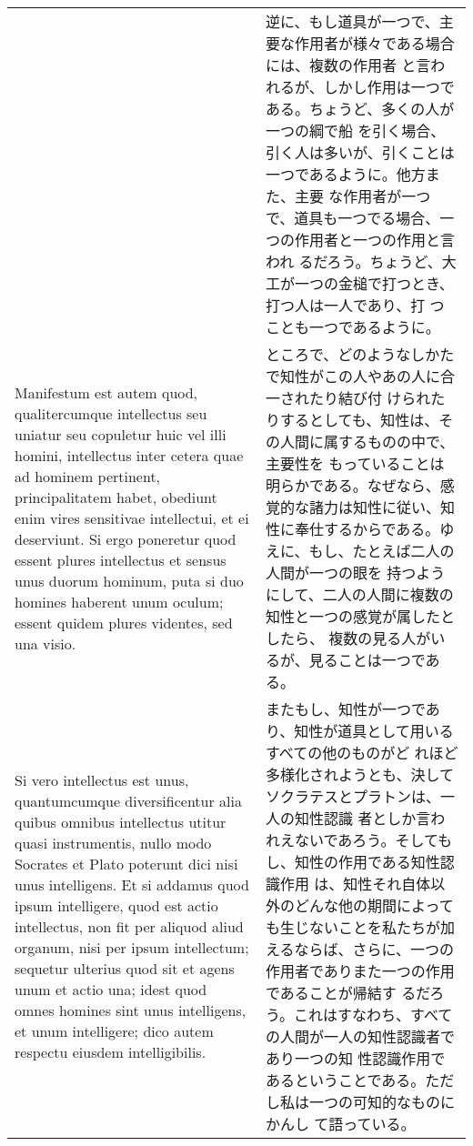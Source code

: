 \documentclass[paper=a4paper,fontsize=10pt,jafontsize=9pt,titlepage]{jlreq}
\begin{document}
\begin{longtable}{p{21em}p{21em}}
&

逆に、もし道具が一つで、主要な作用者が様々である場合には、複数の作用者
と言われるが、しかし作用は一つである。ちょうど、多くの人が一つの綱で船
を引く場合、引く人は多いが、引くことは一つであるように。他方また、主要
な作用者が一つで、道具も一つでる場合、一つの作用者と一つの作用と言われ
るだろう。ちょうど、大工が一つの金槌で打つとき、打つ人は一人であり、打
つことも一つであるように。
 
\\

 Manifestum est autem quod, qualitercumque intellectus seu uniatur seu
 copuletur huic vel illi homini, intellectus inter cetera quae ad
 hominem pertinent, principalitatem habet, obediunt enim vires
 sensitivae intellectui, et ei deserviunt. Si ergo poneretur quod
 essent plures intellectus et sensus unus duorum hominum, puta si duo
 homines haberent unum oculum; essent quidem plures videntes, sed una
 visio.

&

 ところで、どのようなしかたで知性がこの人やあの人に合一されたり結び付
 けられたりするとしても、知性は、その人間に属するものの中で、主要性を
 もっていることは明らかである。なぜなら、感覚的な諸力は知性に従い、知
 性に奉仕するからである。ゆえに、もし、たとえば二人の人間が一つの眼を
 持つようにして、二人の人間に複数の知性と一つの感覚が属したとしたら、
 複数の見る人がいるが、見ることは一つである。

 \\

 Si vero intellectus est unus, quantumcumque diversificentur alia
 quibus omnibus intellectus utitur quasi instrumentis, nullo modo
 Socrates et Plato poterunt dici nisi unus intelligens. Et si addamus
 quod ipsum intelligere, quod est actio intellectus, non fit per
 aliquod aliud organum, nisi per ipsum intellectum; sequetur ulterius
 quod sit et agens unum et actio una; idest quod omnes homines sint
 unus intelligens, et unum intelligere; dico autem respectu eiusdem
 intelligibilis.

&

またもし、知性が一つであり、知性が道具として用いるすべての他のものがど
れほど多様化されようとも、決してソクラテスとプラトンは、一人の知性認識
者としか言われえないであろう。そしてもし、知性の作用である知性認識作用
は、知性それ自体以外のどんな他の期間によっても生じないことを私たちが加
えるならば、さらに、一つの作用者でありまた一つの作用であることが帰結す
るだろう。これはすなわち、すべての人間が一人の知性認識者であり一つの知
性認識作用であるということである。ただし私は一つの可知的なものにかんし
て語っている。
 

\end{longtable}
\end{document}
